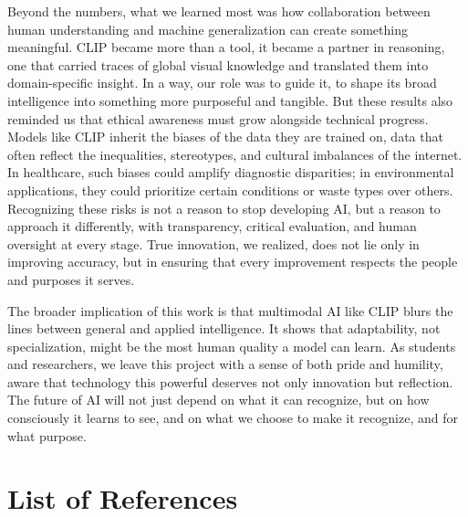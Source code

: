 \documentclass[12pt]{article}
\begin{document}
Beyond the numbers, what we learned most was how collaboration between human understanding and machine generalization can create something meaningful. CLIP became more than a tool, it became a partner in reasoning, one that carried traces of global visual knowledge and translated them into domain-specific insight. In a way, our role was to guide it, to shape its broad intelligence into something more purposeful and tangible.
But these results also reminded us that ethical awareness must grow alongside technical progress. Models like CLIP inherit the biases of the data they are trained on, data that often reflect the inequalities, stereotypes, and cultural imbalances of the internet. In healthcare, such biases could amplify diagnostic disparities; in environmental applications, they could prioritize certain conditions or waste types over others. Recognizing these risks is not a reason to stop developing AI, but a reason to approach it differently, with transparency, critical evaluation, and human oversight at every stage. True innovation, we realized, does not lie only in improving accuracy, but in ensuring that every improvement respects the people and purposes it serves.

The broader implication of this work is that multimodal AI like CLIP blurs the lines between general and applied intelligence. It shows that adaptability, not specialization, might be the most human quality a model can learn. As students and researchers, we leave this project with a sense of both pride and humility, aware that technology this powerful deserves not only innovation but reflection. The future of AI will not just depend on what it can recognize, but on how consciously it learns to see, and on what we choose to make it recognize, and for what purpose.

\newpage
\section*{List of References}
\end{document}
